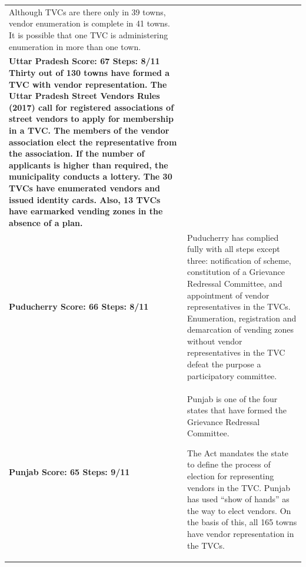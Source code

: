\documentclass[a4paper, 12pt, twoside]{article}
\begin{document}
\begin{longtable}[l]{>{\raggedright}p{4cm}>{\raggedright\arraybackslash}p{10cm}}
Although TVCs are there only in 39 towns, vendor enumeration is complete in 41 towns. It is possible that one TVC is administering enumeration in more than one town.
\\
\cellcolor{SVACgreen3}\bf{Uttar Pradesh}
\newline
\bf{Score: 67}
\newline
\bf{Steps: 8/11}
\cellcolor{SVACgreen2}Thirty out of 130 towns have formed a TVC with vendor representation. The Uttar Pradesh Street Vendors Rules (2017) call for registered associations of street vendors to apply for membership in a TVC. The members of the vendor association elect the representative from the association. If the number of applicants is higher than required, the municipality conducts a lottery. The 30 TVCs have enumerated vendors and issued identity cards. Also, 13 TVCs have earmarked vending zones in the absence of a plan.
\\
\cellcolor{SVACgreen3}\bf{Puducherry}
\newline
\bf{Score: 66}
\newline
\bf{Steps: 8/11}
&
\cellcolor{SVACgreen2}Puducherry has complied fully with all steps except three: notification of scheme, constitution of a Grievance Redressal Committee, and appointment of vendor representatives in the TVCs. Enumeration, registration and demarcation of vending zones without vendor representatives in the TVC defeat the purpose a participatory committee.
\\
\cellcolor{SVACgreen3}\bf{Punjab}
\newline
\bf{Score: 65}
\newline
\bf{Steps: 9/11}
&
\cellcolor{SVACgreen2}Punjab is one of the four states that have formed the Grievance Redressal Committee.

The Act mandates the state to define the process of election for representing vendors in the TVC. Punjab has used “show of hands” as the way to elect vendors. On the basis of  this, all 165 towns have vendor representation in the TVCs.



\end{longtable}
\end{document}
